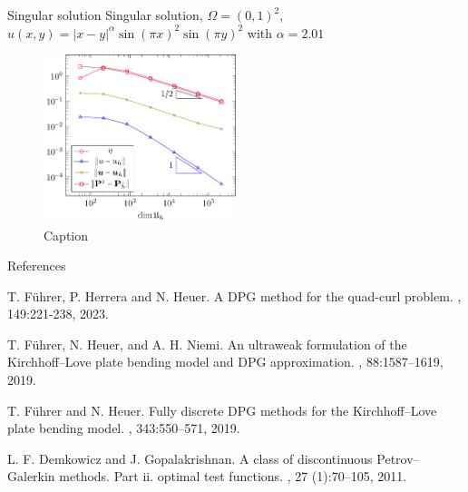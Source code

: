 \documentclass[10pt]{beamer}
\begin{document}
\begin{frame}{Singular solution}
    Singular solution, $\Omega=(0,1)^2$, $u(x,y)=|x-y|^\alpha \sin(\pi x)^2\sin(\pi y)^2$ with $\alpha = 2.01$
    \begin{figure}
        \centering
        \includegraphics[width=0.5\textwidth]{plots_stokes3.pdf}
        \caption{Caption}
        \label{fig:enter-label}
    \end{figure}
\end{frame}


\begin{frame}{References}
\begin{thebibliography}{99}
 T. Führer, P. Herrera and N. Heuer.
\newblock A DPG method for the quad-curl problem.
, 149:221-238, 2023.

T. F\"uhrer, N. Heuer, and A. H. Niemi. 
\newblock An ultraweak formulation of the Kirchhoff–Love plate bending model
and DPG approximation. 
, 88:1587--1619, 2019.

 T. F\"uhrer and N. Heuer. 
\newblock Fully discrete DPG methods for the Kirchhoff–Love plate bending model. 
, 343:550--571, 2019.


 L. F. Demkowicz and J. Gopalakrishnan. 
\newblock A class of discontinuous Petrov–Galerkin methods. Part ii. optimal test functions.
, 27 (1):70--105, 2011. 
 \end{thebibliography}
\end{frame}
\end{document}
